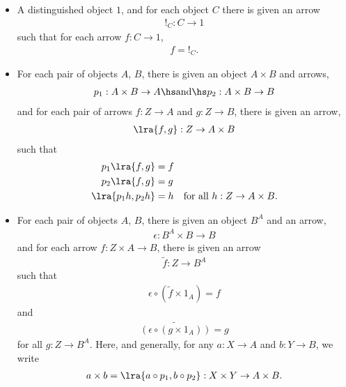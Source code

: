 \documentclass{article}
\begin{document}
\begin{proposition}[Awodey p. 134]
    \begin{itemize}
        \item A distinguished object $1$, and for each object $C$ there
              is given an arrow \begin{align*}
                  !_C:C\to 1
              \end{align*}
              such that for each arrow $f:C\to 1$, \begin{align*}
                  f=!_C.
              \end{align*}
        \item For each pair of objects $A$, $B$, there is given an object
              $A\times B$ and arrows, \begin{align*}
                  p_1:A\times B \to A\hs\text{and}\hs p_2:A\times B\to B
              \end{align*}
              and for each pair of arrows $f:Z\to A$ and $g:Z\to B$, there is given
              an arrow, \begin{align*}
                  \lra{f,g}:Z\to A\times B
              \end{align*}
              such that \begin{align*}
                  p_1\lra{f,g}    & =f                                    \\
                  p_2\lra{f,g}    & =g                                    \\
                  \lra{p_1h,p_2h} & =h & \text{for all }h:Z\to A\times B.
              \end{align*}
        \item For each pair of objects $A$, $B$, there is given an object
              $B^A$ and an arrow, \begin{align*}
                  \epsilon : B^A\times B \to B
              \end{align*}
              and for each arrow $f:Z\times A \to B$, there is given an arrow \begin{align*}
                  \tilde{f}:Z\to B^A
              \end{align*}
              such that \begin{align*}
                  \epsilon\circ(\tilde f \times 1_A)=f
              \end{align*}
              and \begin{align*}
                  \widetilde{(\epsilon\circ(g\times 1_A))}=g
              \end{align*}
              for all $g:Z\to B^A$. Here, and generally, for any $a:X\to A$ and
              $b:Y\to B$, we write
              \begin{align*}
                  a\times b = \lra{a\circ p_1, b\circ p_2}:X\times Y\to A\times B.
              \end{align*}
    \end{itemize}
\end{proposition}
\end{document}
